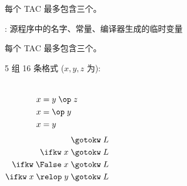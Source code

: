 
\begin{frame}{}
  \begin{definition}
    每个 TAC 最多包含三个。
  \end{definition}

  \pause
  \vspace{0.50cm}
  \begin{center}
    : 源程序中的名字、常量、编译器生成的临时变量
  \end{center}
\end{frame}

\begin{frame}{}
  \begin{definition}
    每个 TAC 最多包含三个。
  \end{definition}

  \vspace{0.80cm}
  \begin{center}
    5 组 16 条格式 ($x, y, z$ 为):
  \end{center}
  \begin{columns}
      \begin{align}
        x &= y \;\op\; z \\
        x &= \op\; y \\
        x &= y
      \end{align}
      \pause
      \begin{align}
        \gotokw\; L \\
        \ifkw\; x \;\gotokw\; L \\
        \ifkw\; \False\; x \;\gotokw\; L \\
        \ifkw\; x \;\relop\; y \;\gotokw\; L
      \end{align}
  \end{columns}
\end{frame}


